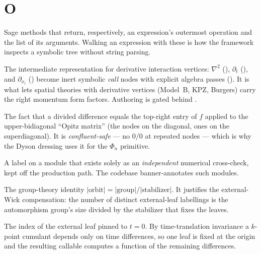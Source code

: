 \section*{O}
\begin{description}[leftmargin=0pt,style=nextline]

  \item[\code{.operator()} / \code{.operands()}] Sage methods that return,
        respectively, an expression's outermost operation and the list of its
        arguments. Walking an expression with these is how the framework inspects a
        symbolic tree without string parsing.

  \item[Operator IR] The intermediate representation for derivative interaction
        vertices: $\nabla^{2}$ (), $\partial_t$ (), and
        $\partial_{x_i}$ () become inert symbolic \emph{call} nodes with
        explicit algebra passes (). It is
        what lets spatial theories with derivative vertices (Model~B, KPZ, Burgers)
        carry the right momentum form factors. Authoring is gated behind
        .

  \item[Opitz theorem] The fact that a divided difference equals the top-right entry
        of $f$ applied to the upper-bidiagonal ``Opitz matrix'' (the nodes on the
        diagonal, ones on the superdiagonal). It is \emph{confluent-safe} --- no
        $0/0$ at repeated nodes --- which is why the Dyson dressing uses it for the
        $\Phi_n$ primitive.

  \item[ORACLE-ONLY] A label on a module that exists solely as an \emph{independent}
        numerical cross-check, kept off the production path. The codebase
        banner-annotates such modules.

  \item[Orbit--stabilizer theorem] The group-theory identity
        $|\text{orbit}|=|\text{group}|/|\text{stabilizer}|$. It justifies the
        external-Wick compensation: the number of distinct external-leaf labellings
        is the automorphism group's size divided by the stabilizer that fixes the
        leaves.

  \item[\code{origin\_leaf\_idx} / origin pinning] The index of the external leaf
        pinned to $t=0$. By time-translation invariance a $k$-point cumulant depends
        only on time differences, so one leaf is fixed at the origin and the
        resulting callable computes a function of the remaining differences.


\end{description}
